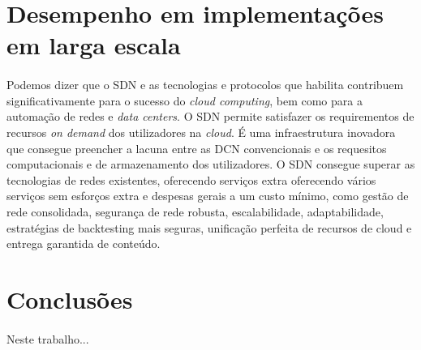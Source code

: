 \documentclass{llncs}
\begin{document}
\section{Desempenho em implementações em larga escala}
\paragraph{}
Podemos dizer que o SDN e as tecnologias e protocolos que habilita contribuem significativamente para o sucesso do \textit {cloud computing}, bem como para a automação de redes e \textit {data centers}. O SDN permite satisfazer os requirementos de recursos \textit{on demand} dos utilizadores na \textit{cloud}. É uma infraestrutura inovadora que consegue preencher a lacuna entre as DCN convencionais e os requesitos computacionais e de armazenamento dos utilizadores.
O SDN consegue superar as tecnologias de redes existentes, oferecendo serviços extra oferecendo vários serviços sem esforços extra e despesas gerais a um custo mínimo, como gestão de rede consolidada, segurança de rede robusta, escalabilidade, adaptabilidade, estratégias de backtesting mais seguras, unificação perfeita de recursos de cloud e entrega garantida de conteúdo.








\section{Conclusões}
\paragraph{}
Neste trabalho...

\printbibliography
\end{document}

